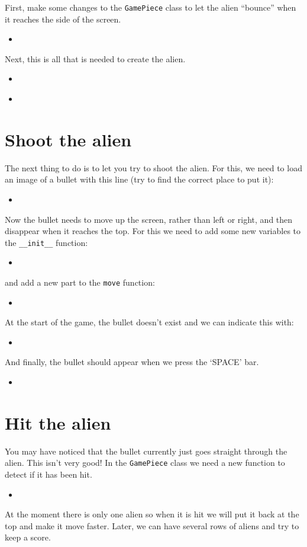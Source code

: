 \documentclass{article}
\newcommand{\pythonscript}[2]{
\begin{itemize}
\item[]
\end{itemize}
}
\begin{document}
First, make some changes to the \texttt{GamePiece} class to let the alien
``bounce'' when it reaches the side of the screen.

\pythonscript{bounce}{Changes to the class}

Next, this is all that is needed to create the alien.

\pythonscript{makealien}{Create the alien object}

\pythonscript{usealien}{Use the alien object}

\section{Shoot the alien}

The next thing to do is to let you try to shoot the alien. For this, we need
to load an image of a bullet with this line (try to find the correct place to
put it):

\pythonscript{loadbullet}{Load the bullet image}

Now the bullet needs to move up the screen, rather than left or right, and
then disappear when it reaches the top. For this we need to add some new
variables to the \texttt{\_\_init\_\_} function:

\pythonscript{bulletinit}{New variables}

and add a new part to the \texttt{move} function:

\pythonscript{bulletmove}{New move function}

At the start of the game, the bullet doesn't exist and we can indicate this
with:

\pythonscript{initialisebullet}{Initialise bullet}

And finally, the bullet should appear when we press the `SPACE' bar.

\pythonscript{fire}{Fire!}

\section{Hit the alien}

You may have noticed that the bullet currently just goes straight through the
alien. This isn't very good! In the \texttt{GamePiece} class we need a new
function to detect if it has been hit.

\pythonscript{detecthit}{Detect a hit}

At the moment there is only one alien so when it is hit we will put it back
at the top and make it move faster. Later, we can have several rows of aliens
and try to keep a score.
\end{document}
